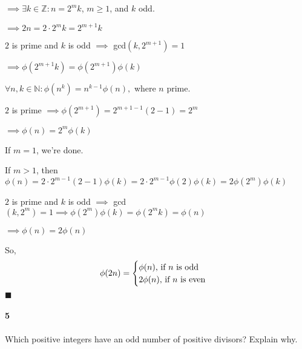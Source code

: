 \documentclass{article}
\begin{document}
$\implies \exists k\in \mathbb{Z}: n = 2^mk$, $m\geq 1$, and $k$ odd.

$\implies 2n = 2\cdot 2^mk = 2^{m+1}k$

$2$ is prime and $k$ is odd $\implies$ gcd$(k, 2^{m+1}) =1$

$\implies \phi(2^{m+1}k) = \phi(2^{m+1})\phi(k)$

$\forall n,k \in \mathbb{N}: \phi(n^k)=
n^{k−1}\phi(n),$ where $n$ prime.

$2$ is prime $\implies \phi(2^{m+1}) = 2^{m + 1-1}(2-1) = 2^m$

$\implies \phi(n) = 2^m\phi(k)$

If $m = 1$, we're done.

If $m > 1$, then $\phi(n) = 2\cdot 2^{m-1}(2-1)\phi(k) = 2
\cdot 2^{m-1}\phi(2)\phi(k) = 2\phi(2^m)\phi(k)$

$2$ is prime and $k$ is odd $\implies$ gcd$(k,2^m) = 1 \implies \phi(2^m)\phi(k) = \phi(2^mk) = \phi(n)$

$\implies \phi(n) = 2\phi(n)$

So,
\[\phi(2n) = \begin{cases}\phi(n)$, if $n$ is odd$\\
                          2\phi(n)$, if $n$ is even$\\\end{cases}\]
\vspace{0.618 em}
$\blacksquare$


\paragraph{5} Which positive integers have an odd number of positive
divisors? Explain why.
\end{document}
